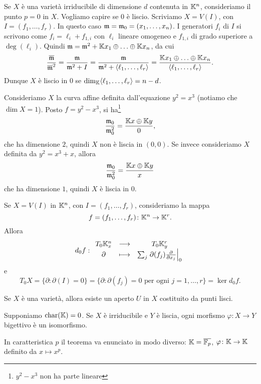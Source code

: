 \begin{remark}
Se $X$ è una varietà irriducibile di dimensione $d$ contenuta in $\mathbb{K}^n$, consideriamo il punto $p=0$ in $X$. Vogliamo capire se $0$ è liscio. Scriviamo $X=V(I)$, con $I=(f_1,\ldots,f_r)$. In questo caso $\mathfrak{m}=\mathfrak{m}_0=(x_1,\ldots,x_n)$. I generatori $f_i$ di $I$ si scrivono come $f_i=\ell_i+f_{1,i}$ con $\ell_i$ lineare omogeneo e $f_{1,i}$ di grado superiore a $\deg(\ell_i)$. Quindi $\mathfrak{m}=\mathfrak{m}^2+\mathbb{K} x_1\oplus \ldots \oplus \mathbb{K} x_n$, da cui \[\frac{\overline{\mathfrak{m}}}{\overline{\mathfrak{m}}^2}=\frac{\mathfrak{m}}{\mathfrak{m}^2+I}=\frac{\mathfrak{m}}{\mathfrak{m}^2+\langle
\ell_1,\ldots,\ell_r\rangle}=\frac{\mathbb{K} x_1\oplus \ldots \oplus \mathbb{K} x_n}{\langle
\ell_1,\ldots,\ell_r\rangle}.\] Dunque $X$ è liscio in $0$ se $\dim_{\mathbb{K}}\langle
\ell_1,\ldots,\ell_r\rangle=n-d$.
\end{remark}

\begin{example}
    Consideriamo $X$ la curva affine definita dall'equazione $y^2=x^3$ (notiamo che $\dim X=1$). Posto $f=y^2-x^3$, si ha\footnote{$y^2-x^3$ non ha parte lineare}
    \[\frac{\mathfrak{m}_0}{\mathfrak{m}_0^2}=\frac{\mathbb{K} x\oplus \mathbb{K} y}{0},\] 
    che ha dimensione $2$, quindi $X$ non è liscia in $(0,0)$. Se invece consideriamo $X$ definita da $y^2=x^3+x$, allora 
    \[\frac{\mathfrak{m}_0}{\mathfrak{m}_0^2}=\frac{\mathbb{K} x\oplus \mathbb{K} y}{x}\]
    che ha dimensione $1$, quindi $X$ è liscia in $0$.
\end{example}

\begin{example}
    Se $X=V(I)$ in $\mathbb{K}^n$, con $I=(f_1,\ldots,f_r)$, consideriamo la mappa \[f=(f_1,\ldots,f_r)\colon \mathbb{K}^n \to \mathbb{K}^r.\] Allora 
    \[d_0f:\begin{array}{ccc} {T_0 \mathbb{K}^n_x} & \longrightarrow & {T_0 \mathbb{K}^r_y}\\ {\partial} & \longmapsto & {\sum_j \left.\partial(f_j)\frac{\partial}{\partial x_j}\right\lvert_0} \end{array}\]
    e \[T_0 X=\{\partial\colon \partial(I)=0\}=\{\partial\colon \partial(f_j)=0 \text{ per ogni }j=1,\ldots,r\}=\ker d_0f.\]
\end{example}

\begin{theorem}
    Se $X$ è una varietà, allora esiste un aperto $U$ in $X$ costituito da punti lisci.
\end{theorem}



\begin{theorem}[Zariski]\label{ThZariski}
Supponiamo $\operatorname{char}(\mathbb{K})=0$. Se $X$ \`e irriducibile e $Y$ \`e liscia, ogni morfismo $\varphi\colon X\to Y$ bigettivo è un isomorfismo.    
\end{theorem}

In caratteristica $p$ il teorema va enunciato in modo diverso: $\mathbb{K}=\overline{\mathbb{F}_p}$, $\varphi\colon \mathbb{K} \to \mathbb{K}$ definito da $x\mapsto x^p$.


